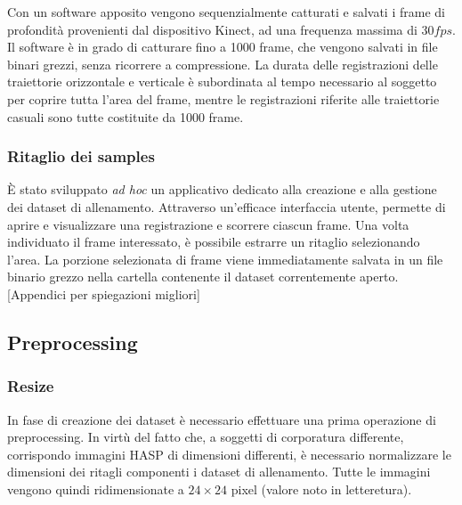                 Con un software apposito %
                vengono sequenzialmente catturati e salvati i frame di profondità provenienti dal dispositivo Kinect, ad una frequenza massima di $30 fps$.
                Il software è in grado di catturare fino a 1000 frame, che vengono salvati in file binari grezzi, senza ricorrere a compressione.
                La durata delle registrazioni delle traiettorie orizzontale e verticale è subordinata al tempo necessario al soggetto per coprire tutta l'area del frame, mentre le registrazioni riferite alle traiettorie casuali sono tutte costituite da 1000 frame.

            \subsubsection{Ritaglio dei samples}
                È stato sviluppato \emph{ad hoc} un applicativo dedicato alla creazione e alla gestione dei dataset di allenamento.
                Attraverso un'efficace interfaccia utente, permette di aprire e visualizzare una registrazione e scorrere ciascun frame. Una volta individuato il frame interessato, è possibile estrarre un ritaglio selezionando l'area. La porzione selezionata di frame viene immediatamente salvata in un file binario grezzo nella cartella contenente il dataset correntemente aperto.
                [Appendici per spiegazioni migliori]

        \subsection{Preprocessing}
        \label{sub:preprocessing}
            \subsubsection{Resize}
                In fase di creazione dei dataset è necessario effettuare una prima operazione di preprocessing.
                In virtù del fatto che, a soggetti di corporatura differente, corrispondo immagini HASP di dimensioni differenti, è necessario normalizzare le dimensioni dei ritagli componenti i dataset di allenamento.
                Tutte le immagini vengono quindi ridimensionate a $24 \times 24$ pixel (valore noto in letteretura).

